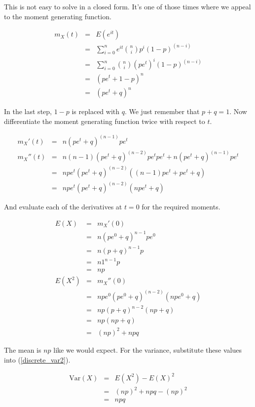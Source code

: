 \documentclass[]{article}
\begin{document}
This is not easy to solve in a closed form.  It's
one of those times where we appeal to the moment generating
function.

\begin{eqnarray*}
m_X(t) & = & E(e^{it}) \\
   & = & \sum_{i=0}^n e^{it} {n \choose i} p^i (1-p)^{(n-i)} \\
   & = & \sum_{i=0}^n {n \choose i} (pe^t)^i (1-p)^{(n-i)} \\
   & = & (pe^t + 1 - p)^n \\
   & = & (pe^t + q)^n
\end{eqnarray*}

In the last step, $1-p$ is replaced with $q$.  We just
remember that $p + q = 1$.  Now
differentiate the moment generating function twice with
respect to $t$.

\begin{eqnarray*}
m_X'(t) & = & n(pe^t + q)^{(n-1)} pe^t \\
m_X''(t) & = & n(n-1)(pe^t + q)^{(n-2)} pe^t pe^t +
          n(pe^t + q)^{(n-1)} pe^t \\
   & = & npe^t(pe^t + q)^{(n-2)}((n-1)pe^t + pe^t + q) \\
   & = & npe^t(pe^t + q)^{(n-2)}(npe^t + q)
\end{eqnarray*}

And evaluate each of the derivatives at $t=0$ for the
required moments.

\begin{eqnarray*}
E(X) & = & m_X'(0) \\
   & = & n(pe^0 + q)^{n-1} pe^0 \\
   & = & n(p+q)^{n-1}p \\
   & = & n1^{n-1}p \\
   & = & np  \\
E(X^2) & = & m_X''(0) \\
   & = & npe^0(pe^0 + q)^{(n-2)}(npe^0 + q) \\
   & = & np(p+q)^{n-2} (np + q) \\
   & = & np (np+q) \\
   & = & (np)^2 + npq
\end{eqnarray*}

The mean is $np$ like we would expect.  For the variance,
substitute these values into (\ref{discrete_var2}).

\begin{eqnarray}
\mbox{Var}(X) & = & E(X^2) - E(X)^2 \nonumber \\
   & = & (np)^2 + npq - (np)^2 \nonumber \\
   & = & npq \label{binomial_var}
\end{eqnarray}
\end{document}
